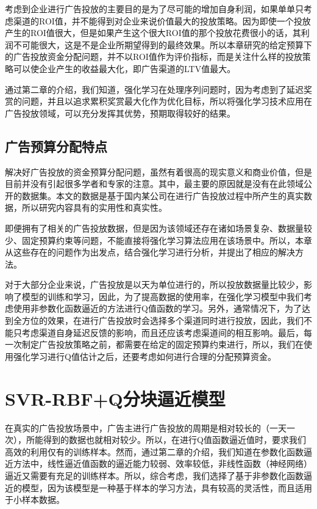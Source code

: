 考虑到企业进行广告投放的主要目的是为了尽可能的增加自身利润，如果单单只考虑渠道的ROI值，并不能得到对企业来说价值最大的投放策略。因为即使一个投放产生的ROI值很大，但是如果产生这个很大ROI值的那个投放花费很小的话，其利润不可能很大，这是不是企业所期望得到的最终效果。所以本章研究的给定预算下的广告投放资金分配问题，并不以ROI值作为评价指标，而是关注什么样的投放策略可以使企业产生的收益最大化，即广告渠道的LTV值最大。

通过第二章的介绍，我们知道，强化学习在处理序列问题时，因为考虑到了延迟奖赏的问题，并且以追求累积奖赏最大化作为优化目标，所以将强化学习技术应用在广告投放领域，可以充分发挥其优势，预期取得较好的结果。

\subsection{广告预算分配特点}
解决好广告投放的资金预算分配问题，虽然有着很高的现实意义和商业价值，但是目前并没有引起很多学者和专家的注意。其中，最主要的原因就是没有在此领域公开的数据集。本文的数据是基于国内某公司在进行广告投放过程中所产生的真实数据，所以研究内容具有的实用性和真实性。

即便拥有了相关的广告投放数据，但是因为该领域还存在诸如场景复杂、数据量较少、固定预算约束等问题，不能直接将强化学习算法应用在该场景中。所以，本章从这些存在的问题作为出发点，结合强化学习进行分析，并提出了相应的解决方法。

对于大部分企业来说，广告投放是以天为单位进行的，所以投放数据量比较少，影响了模型的训练和学习，因此，为了提高数据的使用率，在强化学习模型中我们考虑使用非参数化函数逼近的方法进行Q值函数的学习。另外，通常情况下，为了达到全方位的效果，在进行广告投放时会选择多个渠道同时进行投放，因此，我们不能只考虑渠道自身延迟反馈的影响，而且还应该考虑渠道间的相互影响。最后，每一次制定广告投放策略之前，都需要在给定的固定预算约束进行，所以，我们在使用强化学习进行Q值估计之后，还要考虑如何进行合理的分配预算资金。

\section{SVR-RBF+Q分块逼近模型}
在真实的广告投放场景中，广告主进行广告投放的周期是相对较长的（一天一次），所能得到的数据也就相对较少。所以，在进行Q值函数逼近值时，要求我们高效的利用仅有的训练样本。然而，通过第二章的介绍，我们知道在参数化函数逼近方法中，线性逼近值函数的逼近能力较弱、效率较低，非线性函数（神经网络）逼近又需要有充足的训练样本。所以，综合考虑，我们选择了基于非参数化函数逼近的模型，因为该模型是一种基于样本的学习方法，具有较高的灵活性，而且适用于小样本数据。


